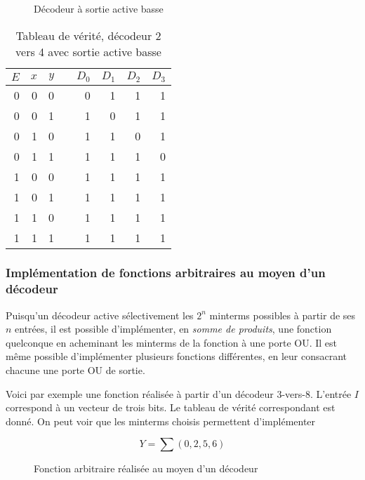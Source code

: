 \documentclass[11pt]{article}
\begin{document}
\begin{figure}[htbp]
\centering

\caption{\label{fig:orgc084c7a}Décodeur à sortie active basse}
\end{figure}


\begin{table}[htbp]
\caption{\label{tab:org751e2be}Tableau de vérité, décodeur 2 vers 4 avec sortie active basse}
\centering
\begin{tabular}{rrrlrrrr}
\(E\) & \(x\) & \(y\) &  & \(D_0\) & \(D_1\) & \(D_2\) & \(D_3\)\\
\hline
0 & 0 & 0 &  & 0 & 1 & 1 & 1\\
0 & 0 & 1 &  & 1 & 0 & 1 & 1\\
0 & 1 & 0 &  & 1 & 1 & 0 & 1\\
0 & 1 & 1 &  & 1 & 1 & 1 & 0\\
1 & 0 & 0 &  & 1 & 1 & 1 & 1\\
1 & 0 & 1 &  & 1 & 1 & 1 & 1\\
1 & 1 & 0 &  & 1 & 1 & 1 & 1\\
1 & 1 & 1 &  & 1 & 1 & 1 & 1\\
\end{tabular}
\end{table}


\subsubsection{Implémentation de fonctions arbitraires au moyen d'un décodeur}
\label{sec:org8ec2731}

Puisqu'un décodeur active sélectivement les \(2^n\) minterms possibles
à partir de ses \(n\) entrées, il est possible d'implémenter, en \emph{somme
de produits}, une fonction quelconque en acheminant les minterms de la
fonction à une porte OU. Il est même possible d'implémenter plusieurs
fonctions différentes, en leur consacrant chacune une porte OU de
sortie.

Voici par exemple une fonction réalisée à partir d'un décodeur
3-vers-8. L'entrée \(I\) correspond à un vecteur de trois bits. Le
tableau de vérité correspondant est donné. On peut voir que les
minterms choisis permettent d'implémenter

$$ Y = \sum(0,2,5,6)$$

\begin{figure}[htbp]
\centering

\caption{\label{fig:org282c26c}Fonction arbitraire réalisée au moyen d'un décodeur}
\end{figure}
\end{document}

